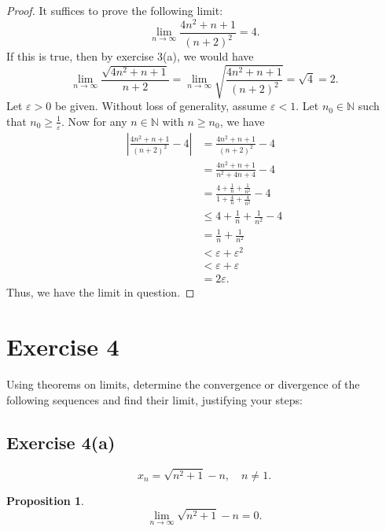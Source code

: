 \documentclass[12pt]{article}
\newtheorem{proposition}{Proposition}
\newenvironment{problem}
    {\begin{lrbox}{\mybox}\begin{minipage}{0.98\textwidth}}
    {\end{minipage}\end{lrbox}\framebox[\textwidth]{\usebox{\mybox}}}
\let\eps\varepsilon %
\newcommand{\N}{\mathbb{N}} %
\newcommand{\<}{\left\langle} %
\renewcommand{\>}{\right\rangle} %
\begin{document}
\begin{proof}
    It suffices to prove the following limit:
    \[\lim_{n\to\infty}\frac{4n^2+n+1}{(n+2)^2} = 4.\]
    If this is true, then by exercise 3(a), we would have
    \[\lim_{n\to \infty} \frac{\sqrt{4n^2+n+1}}{n+2} = \lim_{n\to\infty}\sqrt{\frac{4n^2+n+1}{(n+2)^2}} = \sqrt{4} = 2.\]
    Let $\eps>0$ be given. Without loss of generality, assume $\eps<1$. Let $n_0\in\N$ such that $n_0 \geq \frac1\eps$. Now for any $n\in\N$ with $n\geq n_0$, we have
    \begin{align*}
        \left| \frac{4n^2+n+1}{(n+2)^2} - 4 \right|
            &= \frac{4n^2+n+1}{(n+2)^2} - 4 \\
            &= \frac{4n^2+n+1}{n^2 + 4n + 4} - 4 \\
            &= \frac{4+\frac1n+\frac1{n^2}}{1 + \frac4n + \frac4{n^2}} - 4 \\
            &\leq 4+\frac1n+\frac1{n^2} - 4 \\
            &= \frac1n+\frac1{n^2} \\
            &< \eps + \eps^2 \\
            &< \eps + \eps \\
            &= 2\eps.
    \end{align*}
    Thus, we have the limit in question.
    
\end{proof}

\newpage
\section*{Exercise 4}
\begin{problem}
    Using theorems on limits, determine the convergence or divergence of the following sequences and find their limit, justifying your steps:
\end{problem}

\subsection*{Exercise 4(a)}
\begin{problem}
    \begin{equation}
        x_n = \sqrt{n^2+1} - n, \quad n \ne 1.
    \end{equation}
\end{problem}

\begin{proposition}
    \[\lim_{n\to\infty} \sqrt{n^2+1} - n = 0.\]
\end{proposition}
\end{document}
